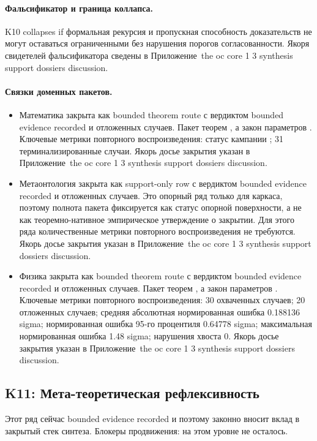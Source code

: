 \paragraph{Фальсификатор и граница коллапса.}
K10 collapses if формальная рекурсия и пропускная способность доказательств не могут оставаться ограниченными без нарушения порогов согласованности.
Якоря свидетелей фальсификатора сведены в Приложение~the oc core 1 3 synthesis support dossiers discussion.

\paragraph{Связки доменных пакетов.}
\begin{itemize}[leftmargin=1.6em,nosep]
\item Математика закрыта как bounded theorem route с вердиктом bounded evidence recorded и  отложенных случаев. Пакет теорем , а закон параметров . Ключевые метрики повторного воспроизведения: статус кампании ; 31 терминализированные случаи. Якорь досье закрытия указан в Приложение~the oc core 1 3 synthesis support dossiers discussion.
\item Метаонтология закрыта как support-only row с вердиктом bounded evidence recorded и  отложенных случаев. Это опорный ряд только для каркаса, поэтому полнота пакета фиксируется как статус опорной поверхности, а не как теоремно-нативное эмпирическое утверждение о закрытии. Для этого ряда количественные метрики повторного воспроизведения не требуются. Якорь досье закрытия указан в Приложение~the oc core 1 3 synthesis support dossiers discussion.
\item Физика закрыта как bounded theorem route с вердиктом bounded evidence recorded и  отложенных случаев. Пакет теорем , а закон параметров . Ключевые метрики повторного воспроизведения: 30 охваченных случаев; 20 отложенных случаев; средняя абсолютная нормированная ошибка 0.188136 sigma; нормированная ошибка 95-го процентиля 0.64778 sigma; максимальная нормированная ошибка 1.48 sigma; нарушения хвоста 0. Якорь досье закрытия указан в Приложение~the oc core 1 3 synthesis support dossiers discussion.
\end{itemize}

\subsection{K11: Мета-теоретическая рефлексивность}
\label{sec:oc-core-1-3-synthesis-k11}
Этот ряд сейчас bounded evidence recorded и поэтому законно вносит вклад в закрытый стек синтеза.
Блокеры продвижения: на этом уровне не осталось.

